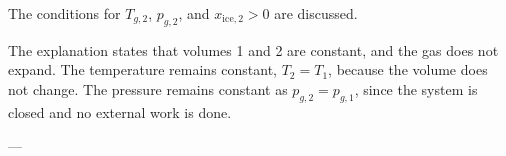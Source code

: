The conditions for \( T_{g,2} \), \( p_{g,2} \), and \( x_{\text{ice},2} > 0 \) are discussed.  

The explanation states that volumes 1 and 2 are constant, and the gas does not expand. The temperature remains constant, \( T_2 = T_1 \), because the volume does not change. The pressure remains constant as \( p_{g,2} = p_{g,1} \), since the system is closed and no external work is done.  

---